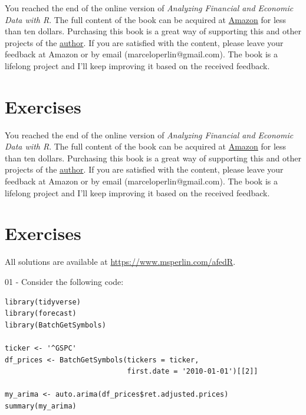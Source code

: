 \documentclass[
  12pt,
]{book}
\newenvironment{pleasebuyit}
{\begin{noteblock}
		
	} {\end{noteblock}}
\begin{document}
\begin{pleasebuyit}
You reached the end of the online version of \emph{Analyzing Financial
and Economic Data with R}. The full content of the book can be acquired
at \href{https://www.amazon.com/dp/B084LSNXMN}{Amazon} for less than ten
dollars. Purchasing this book is a great way of supporting this and
other projects of the \href{https://www.msperlin.com/}{author}. If you
are satisfied with the content, please leave your feedback at Amazon or
by email (marceloperlin@gmail.com). The book is a lifelong project and
I'll keep improving it based on the received feedback.
\end{pleasebuyit}

\hypertarget{exercises-15}{%
\section{Exercises}\label{exercises-15}}

\begin{pleasebuyit}
You reached the end of the online version of \emph{Analyzing Financial
and Economic Data with R}. The full content of the book can be acquired
at \href{https://www.amazon.com/dp/B084LSNXMN}{Amazon} for less than ten
dollars. Purchasing this book is a great way of supporting this and
other projects of the \href{https://www.msperlin.com/}{author}. If you
are satisfied with the content, please leave your feedback at Amazon or
by email (marceloperlin@gmail.com). The book is a lifelong project and
I'll keep improving it based on the received feedback.
\end{pleasebuyit}

\hypertarget{exercises-16}{%
\section{Exercises}\label{exercises-16}}

All solutions are available at \url{https://www.msperlin.com/afedR}.

01 -
Consider the following code:

\begin{verbatim}
library(tidyverse)
library(forecast)
library(BatchGetSymbols)

ticker <- '^GSPC'
df_prices <- BatchGetSymbols(tickers = ticker, 
                             first.date = '2010-01-01')[[2]]

my_arima <- auto.arima(df_prices$ret.adjusted.prices)
summary(my_arima)
\end{verbatim}
\end{document}
